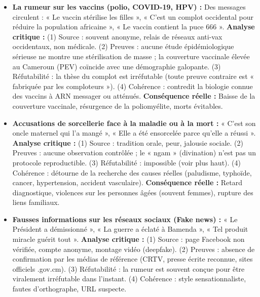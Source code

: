 \documentclass[11pt]{article}
\begin{document}
\begin{exemplebox}
\begin{itemize}
    \item \textbf{La rumeur sur les vaccins (polio, COVID-19, HPV) :} Des messages circulent : « Le vaccin stérilise les filles », « C'est un complot occidental pour réduire la population africaine », « Le vaccin contient la puce 666 ». \textbf{Analyse critique :} (1) Source : souvent anonyme, relais de réseaux anti-vax occidentaux, non médicale. (2) Preuves : aucune étude épidémiologique sérieuse ne montre une stérilisation de masse ; la couverture vaccinale élevée au Cameroun (PEV) coïncide avec une démographie galopante. (3) Réfutabilité : la thèse du complot est irréfutable (toute preuve contraire est « fabriquée par les comploteurs »). (4) Cohérence : contredit la biologie connue des vaccins à ARN messager ou atténués. \textbf{Conséquence réelle :} Baisse de la couverture vaccinale, résurgence de la poliomyélite, morts évitables.
    \item \textbf{Accusations de sorcellerie face à la maladie ou à la mort :} « C'est son oncle maternel qui l'a mangé », « Elle a été ensorcelée parce qu'elle a réussi ». \textbf{Analyse critique :} (1) Source : tradition orale, peur, jalousie sociale. (2) Preuves : aucune observation contrôlée ; le « ngam » (divination) n'est pas un protocole reproductible. (3) Réfutabilité : impossible (voir plus haut). (4) Cohérence : détourne de la recherche des causes réelles (paludisme, typhoïde, cancer, hypertension, accident vasculaire). \textbf{Conséquence réelle :} Retard diagnostique, violences sur les personnes âgées (souvent femmes), rupture des liens familiaux.
    \item \textbf{Fausses informations sur les réseaux sociaux (Fake news) :} « Le Président a démissionné », « La guerre a éclaté à Bamenda », « Tel produit miracle guérit tout ». \textbf{Analyse critique :} (1) Source : page Facebook non vérifiée, compte anonyme, montage vidéo (deepfake). (2) Preuves : absence de confirmation par les médias de référence (CRTV, presse écrite reconnue, sites officiels .gov.cm). (3) Réfutabilité : la rumeur est souvent conçue pour être viralement irréfutable dans l'instant. (4) Cohérence : style sensationnaliste, fautes d'orthographe, URL suspecte.
\end{itemize}
\end{exemplebox}
\end{document}
